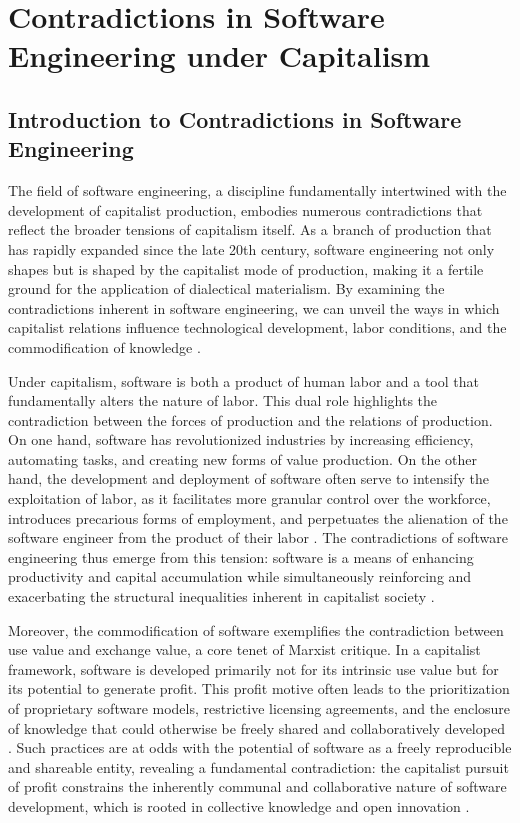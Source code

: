 \chapter{Contradictions in Software Engineering under Capitalism}
\begin{refsection}
    
\section{Introduction to Contradictions in Software Engineering}

The field of software engineering, a discipline fundamentally intertwined with the development of capitalist production, embodies numerous contradictions that reflect the broader tensions of capitalism itself. As a branch of production that has rapidly expanded since the late 20th century, software engineering not only shapes but is shaped by the capitalist mode of production, making it a fertile ground for the application of dialectical materialism. By examining the contradictions inherent in software engineering, we can unveil the ways in which capitalist relations influence technological development, labor conditions, and the commodification of knowledge \cite[pp.~45-50]{marx2008}.

Under capitalism, software is both a product of human labor and a tool that fundamentally alters the nature of labor. This dual role highlights the contradiction between the forces of production and the relations of production. On one hand, software has revolutionized industries by increasing efficiency, automating tasks, and creating new forms of value production. On the other hand, the development and deployment of software often serve to intensify the exploitation of labor, as it facilitates more granular control over the workforce, introduces precarious forms of employment, and perpetuates the alienation of the software engineer from the product of their labor \cite[pp.~30-35]{fuchs2014}. The contradictions of software engineering thus emerge from this tension: software is a means of enhancing productivity and capital accumulation while simultaneously reinforcing and exacerbating the structural inequalities inherent in capitalist society \cite[pp.~67-72]{caffentzis2013}.

Moreover, the commodification of software exemplifies the contradiction between use value and exchange value, a core tenet of Marxist critique. In a capitalist framework, software is developed primarily not for its intrinsic use value but for its potential to generate profit. This profit motive often leads to the prioritization of proprietary software models, restrictive licensing agreements, and the enclosure of knowledge that could otherwise be freely shared and collaboratively developed \cite[pp.~110-115]{benkler2010}. Such practices are at odds with the potential of software as a freely reproducible and shareable entity, revealing a fundamental contradiction: the capitalist pursuit of profit constrains the inherently communal and collaborative nature of software development, which is rooted in collective knowledge and open innovation \cite[pp.~95-100]{mosco2011}.


\end{refsection}
